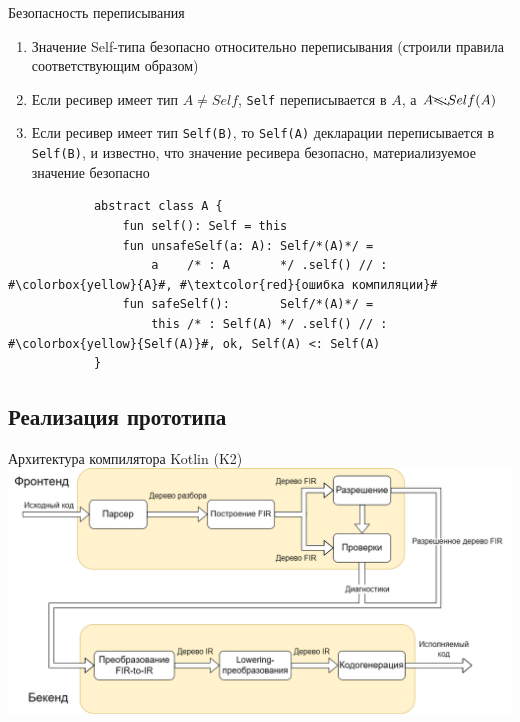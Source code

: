 \documentclass[usenames, dvipsnames]{beamer}
\begin{document}
    \begin{frame}[fragile]{Безопасность переписывания}
        \begin{enumerate}
            \item Значение Self-типа безопасно относительно переписывания (строили правила соответствующим образом)
            \item Если ресивер имеет тип $A \neq Self$, \texttt{Self} переписывается в $A$, а $A \bcancel{<:} Self(A)$
            \item Если ресивер имеет тип \texttt{Self(B)}, то \texttt{Self(A)} декларации переписывается в \texttt{Self(B)}, и известно, что значение ресивера безопасно, материализуемое значение безопасно
        \end{enumerate}

        \vspace{1em}
        \begin{verbatim}
            abstract class A {
                fun self(): Self = this
                fun unsafeSelf(a: A): Self/*(A)*/ =
                    a    /* : A       */ .self() // : #\colorbox{yellow}{A}#, #\textcolor{red}{ошибка компиляции}#
                fun safeSelf():       Self/*(A)*/ =
                    this /* : Self(A) */ .self() // : #\colorbox{yellow}{Self(A)}#, ok, Self(A) <: Self(A)
            }
        \end{verbatim}
    \end{frame}


    \subsection{Реализация прототипа}

    \begin{frame}{Архитектура компилятора Kotlin (K2)}
        \includegraphics[width=\textwidth]{fig/arch}
    \end{frame}
\end{document}
